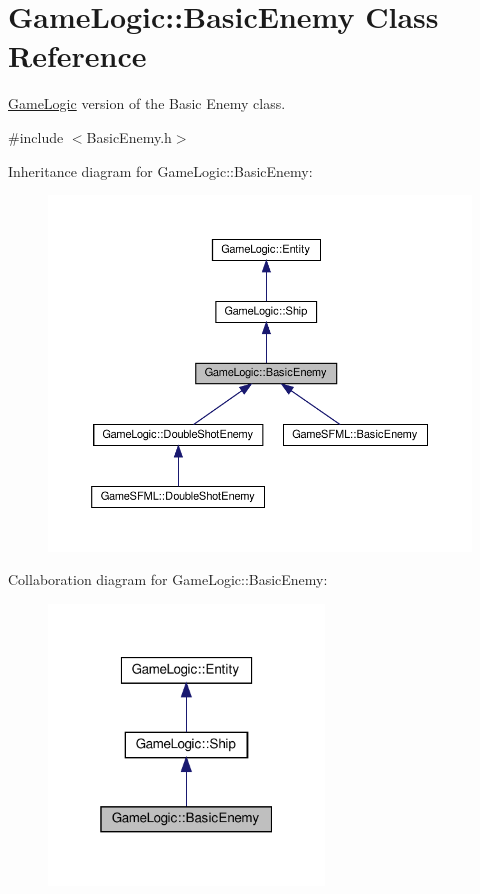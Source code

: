 \hypertarget{classGameLogic_1_1BasicEnemy}{}\section{Game\+Logic\+:\+:Basic\+Enemy Class Reference}
\label{classGameLogic_1_1BasicEnemy}


\hyperlink{namespaceGameLogic}{Game\+Logic} version of the Basic Enemy class.  




{\ttfamily \#include $<$Basic\+Enemy.\+h$>$}



Inheritance diagram for Game\+Logic\+:\+:Basic\+Enemy\+:
\nopagebreak
\begin{figure}[H]
\begin{center}
\leavevmode
\includegraphics[width=350pt]{classGameLogic_1_1BasicEnemy__inherit__graph}
\end{center}
\end{figure}


Collaboration diagram for Game\+Logic\+:\+:Basic\+Enemy\+:\nopagebreak
\begin{figure}[H]
\begin{center}
\leavevmode
\includegraphics[width=208pt]{classGameLogic_1_1BasicEnemy__coll__graph}
\end{center}
\end{figure}
